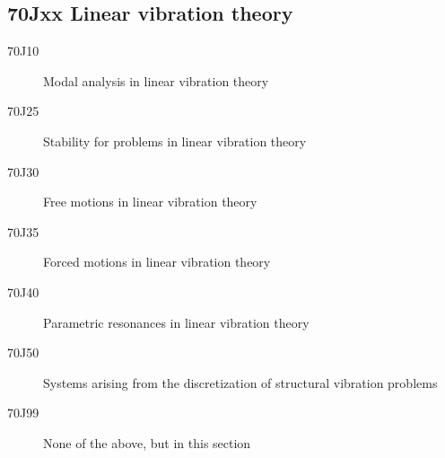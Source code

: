 \documentclass[letterpaper]{article}
\begin{document}
\subsection*{70Jxx  Linear vibration theory }\label{70Jxx}
\begin{description}  
\item [70J10]\label{70J10} Modal analysis in linear vibration theory
\item [70J25]\label{70J25} Stability for problems in linear vibration theory
\item [70J30]\label{70J30} Free motions in linear vibration theory
\item [70J35]\label{70J35} Forced motions in linear vibration theory
\item [70J40]\label{70J40} Parametric resonances in linear vibration theory
\item [70J50]\label{70J50} Systems arising from the discretization of structural vibration problems
\item [70J99]\label{70J99} None of the above, but in this section
\end{description}
\end{document}
